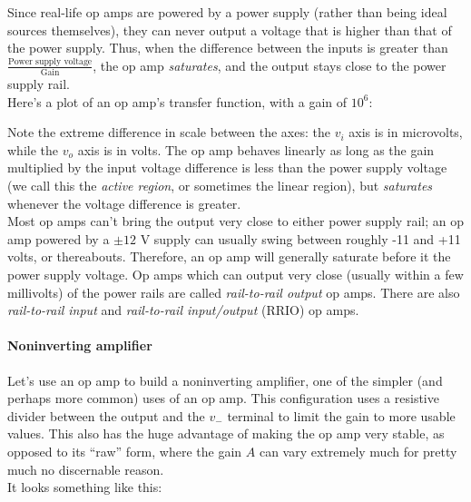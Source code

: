 Since real-life op amps are powered by a power supply (rather than being ideal sources themselves), they can never output a voltage that is higher than that of the power supply. Thus, when the difference between the inputs is greater than $\displaystyle \frac{\text{Power supply voltage}}{\text{Gain}}$, the op amp \emph{saturates}, and the output stays close to the power supply rail.\\
Here's a plot of an op amp's transfer function, with a gain of $10^6$:

\begin{comment}

f[x_] = If[-12*10^-6 <= x <= 12*10^-6, x * 10^6, Sign[x] * 12]

Plot[f[x], {x, -18 * 10^-6, 18 * 10^-6}, PlotRange -> Full,
Ticks -> {
{
{-12*10^-6, "-12\[Mu]V"}, {-6*10^-6, "-6\[Mu]V"}, {6*10^-6 , 
"6\[Mu]V"}, {12*10^-6, "12\[Mu]V"}
}, 
{
{-12, "-12V"}, {-6, "-6V"}, {6, "6V"}, {12, "12V"}
}
}, GridLines -> {
{12 * 10^-6, -12 * 10^-6}, None
},
GridLinesStyle -> Dotted,
AxesLabel -> {"\!\(\*SubscriptBox[\(v\), \(i\)]\)", 
"\!\(\*SubscriptBox[\(v\), \(o\)]\)"}]
\end{comment}


Note the extreme difference in scale between the axes: the $v_i$ axis is in microvolts, while the $v_o$ axis is in volts. The op amp behaves linearly as long as the gain multiplied by the input voltage difference is less than the power supply voltage (we call this the \emph{active region}, or sometimes the linear region), but \emph{saturates} whenever the voltage difference is greater.\\

Most op amps can't bring the output very close to either power supply rail; an op amp powered by a $\pm12$ V supply can usually swing between roughly -11 and +11 volts, or thereabouts. Therefore, an op amp will generally saturate before it the power supply voltage. Op amps which can output very close (usually within a few millivolts) of the power rails are called \emph{rail-to-rail output} op amps. There are also \emph{rail-to-rail input} and \emph{rail-to-rail input/output} (RRIO) op amps.

\paragraph{Noninverting amplifier}
Let's use an op amp to build a noninverting amplifier, one of the simpler (and perhaps more common) uses of an op amp. This configuration uses a resistive divider between the output and the $v_-$ terminal to limit the gain to more usable values. This also has the huge advantage of making the op amp very stable, as opposed to its ``raw'' form, where the gain $A$ can vary extremely much for pretty much no discernable reason.\\
It looks something like this:\\

